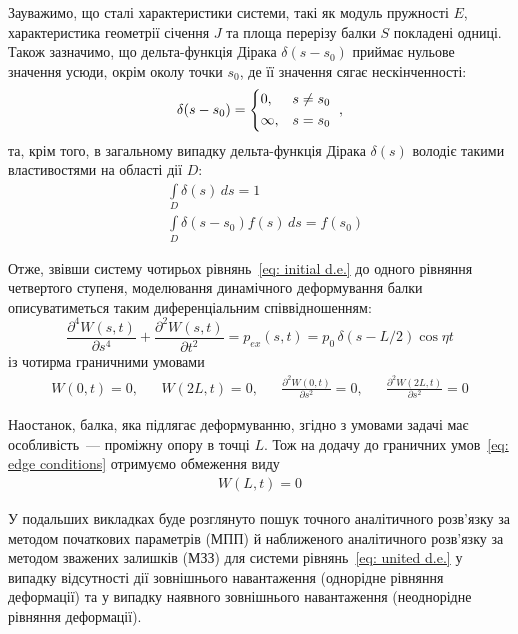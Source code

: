 \documentclass{mathreport}
\begin{document}
Зауважимо, що сталі характеристики системи, такі як модуль пружності $E$, характеристика геометрії січення $J$ та площа перерізу балки $S$ покладені одниці. Також зазначимо, що дельта-функція Дірака $\delta(s-s_0)$ приймає нульове значення усюди, окрім околу точки $s_0$, де її значення сягає нескінченності:
\begin{align}\label{eq: delta Dirac}
    \delta(s-s_0)=
    \begin{cases*}
        0, & $s \neq s_0$ \\
        \infty, & $s=s_0$ \\
    \end{cases*},
\end{align}
та, крім того, в загальному випадку дельта-функція Дірака $\delta(s)$ володіє такими властивостями на області дії $D:$
\begin{align}
    & \int\limits_{D}\delta(s)\,ds = 1 \label{eq: delta Dirac feature 1} \\
    & \int\limits_{D}\delta(s-s_0)f(s)\,ds = f(s_0) \label{eq: delta Dirac feature 2}
\end{align}

Отже, звівши систему чотирьох рівнянь~\eqref{eq: initial d.e.} до одного рівняння четвертого ступеня,  моделювання динамічного деформування балки описуватиметься таким диференціальним співвідношенням:
\begin{equation}\label{eq: united d.e.}
    \frac{\partial^4 W(s,t)}{\partial s^4} + \frac{\partial^2 W(s,t)}{\partial t^2} = p_{ex}(s,t) = p_0\,\delta(s-L/2) \cos{\eta t}
\end{equation}
із чотирма граничними умовами
\begin{align}\label{eq: edge conditions}
    W(0,t)=0, && W(2L,t)=0, && \frac{\partial^2W(0,t)}{\partial s^2}=0, && \frac{\partial^2W(2L,t)}{\partial s^2}=0
\end{align}

Наостанок, балка, яка підлягає деформуванню, згідно з умовами задачі має особливість~--- проміжну опору в точці $L$. Тож на додачу до граничних умов~\eqref{eq: edge conditions} отримуємо обмеження виду
\begin{align}\label{eq: central condition}
    W(L,t)=0
\end{align}

У подальших викладках буде розглянуто пошук точного аналітичного розв'язку за методом початкових параметрів (МПП) й наближеного аналітичного розв'язку за методом зважених залишків (МЗЗ) для системи рівнянь~\eqref{eq: united d.e.} у випадку відсутності дії зовнішнього навантаження (однорідне рівняння деформації) та у випадку наявного зовнішнього навантаження (неоднорідне рівняння деформації).
\end{document}
